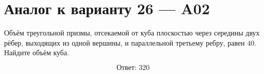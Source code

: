 \documentclass[12pt,a4paper]{article}
\begin{document}
\section*{Аналог к варианту 26 — A02}

Объём треугольной призмы, отсекаемой от куба плоскостью через середины двух рёбер, выходящих из одной вершины, и параллельной третьему ребру, равен \(40\). Найдите объём куба.

\begin{center}
\end{center}

\[
\boxed{\text{Ответ: }320}
\]
\end{document}
